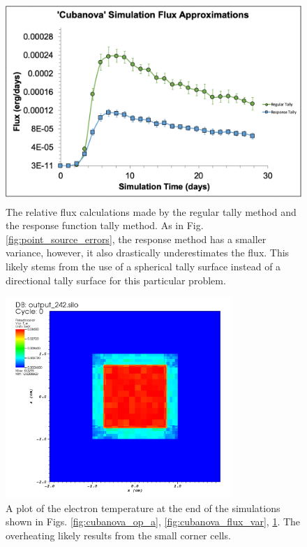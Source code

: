 \documentclass[]{article}
\begin{document}
	\begin{figure} [h!]
		\centering
		\includegraphics[height=3in]{Figures/cubanova_avg_error.png}
		\caption{The relative flux calculations made by the regular tally method and the response function tally method. As in Fig. \ref{fig:point_source_errors}, the response method has a smaller variance, however, it also drastically underestimates the flux. This likely stems from the use of a spherical tally surface instead of a directional tally surface for this particular problem.}
		\label{fig:cubanova_avg_error}
	\end{figure}
	
	\begin{figure} [h!]
		\centering
		\includegraphics[height=3in]{Figures/cubanova_T_e.png}
		\caption{A plot of the electron temperature at the end of the simulations shown in Figs. \ref{fig:cubanova_op_a}, \ref{fig:cubanova_flux_var}, \ref{fig:cubanova_avg_error}. The overheating likely results from the small corner cells. }
		\label{fig:cubanova_T_e}
	\end{figure}
\end{document}
